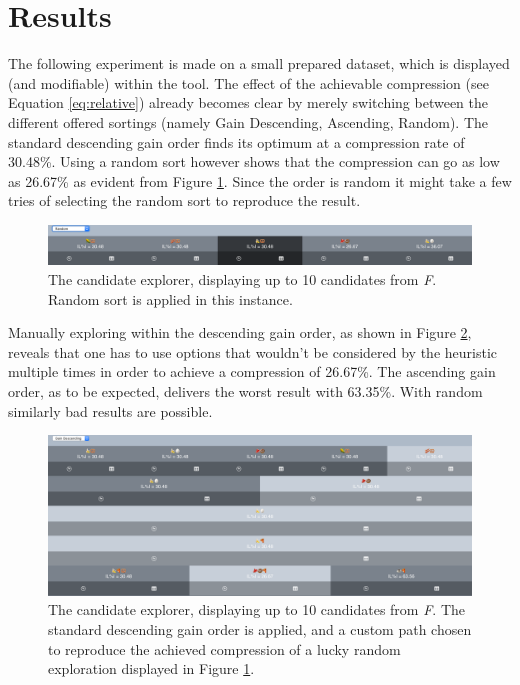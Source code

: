 \documentclass[runningheads]{llncs}
\begin{document}
\section{Results}
\label{sec:experiment}
The following experiment is made on a small prepared dataset, which is displayed (and modifiable) within the tool.
The effect of the achievable compression (see Equation \ref{eq:relative}) already becomes clear by merely switching between the different offered sortings (namely Gain Descending, Ascending, Random).
The standard descending gain order finds its optimum at a compression rate of 30.48\%. Using a random sort however shows that the compression can go as low as 26.67\% as evident from Figure \ref{fig:random}. Since the order is random it might take a few tries of selecting the random sort to reproduce the result.
\begin{figure}
\center
\includegraphics[width=1\linewidth]{img/random_better.png}
\caption{The candidate explorer, displaying up to 10 candidates from \emph{F}. Random sort is applied in this instance.}
\label{fig:random}
\end{figure}

Manually exploring within the descending gain order, as shown in Figure \ref{fig:customWalk}, reveals that one has to use options that wouldn't be considered by the heuristic multiple times in order to achieve a compression of 26.67\%.
The ascending gain order, as to be expected, delivers the worst result with 63.35\%. With random similarly bad results are possible.

\begin{figure}
\center
\includegraphics[width=1\linewidth]{img/custom_walk.png}
\caption{The candidate explorer, displaying up to 10 candidates from \emph{F}. The standard descending gain order is applied, and a custom path chosen to reproduce the achieved compression of a lucky random exploration displayed in Figure \ref{fig:random}.}
\label{fig:customWalk}
\end{figure}
\end{document}
